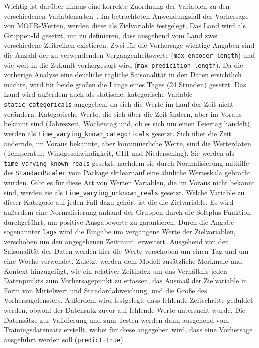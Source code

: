 Wichtig ist darüber hinaus eine korrekte Zuordnung der Variablen zu den verschiedenen Variablenarten~\cite{GitHub.20240307T20:56:16.000Z}.
Im betrachteten Anwendungsfall der Vorhersage von \ac{MOER}-Werten, werden diese als Zielvariable festgelegt.
Das Land wird als Gruppen-Id gesetzt, um zu definieren, dass ausgehend vom Land zwei verschiedene Zeitreihen existieren.
Zwei für die Vorhersage wichtige Angaben sind die Anzahl der zu verwendenden Vergangenheitswerte (\lstinline[columns=fixed]{max_encoder_length}) und wie weit in die Zukunft vorhergesagt wird (\lstinline[columns=fixed]{max_predicition_length}).
Da die vorherige Analyse eine deutliche tägliche Saisonalität in den Daten ersichtlich machte, wird für beide größen die Länge eines Tages (24 Stunden) gesetzt.
Das Land wird außerdem auch als statische, kategorische Variable \lstinline[columns=fixed]{static_categoricals} angegeben, da sich die Werte im Lauf der Zeit nicht verändern.
Kategorische Werte, die sich über die Zeit ändern, aber im Voraus bekannt sind (Jahreszeit, Wochentag und, ob es sich um einen Feiertag handelt), werden als \lstinline[columns=fixed]{time_varying_known_categoricals} gesetzt.
Sich über die Zeit ändernde, im Voraus bekannte, aber kontinuierliche Werte, sind die Wetterdaten (Temperatur, Windgeschwindigkeit, \ac{GHI} und Niederschlag).
Sie werden als \lstinline[columns=fixed]{time_varying_known_reals} gesetzt, nachdem sie durch Normalisierung mithilfe des \lstinline[columns=fixed]{StandardScaler} vom Package \glqq sktlearn\grqq auf eine ähnliche Werteskala gebracht wurden.
Gibt es für diese Art von Werten Variablen, die im Voraus nicht bekannt sind, werden sie als \lstinline[columns=fixed]{time_varying_unknown_reals} gesetzt.
Welche Variable zu dieser Kategorie auf jeden Fall dazu gehört ist die die Zielvariable.
Es wird außerdem eine Normalisierung anhand der Gruppen durch die Softplus-Funktion durchgeführt, um positive Ausgabewerte zu garantieren.
Durch die Angabe sogenannter \lstinline[columns=fixed]{lags} wird die Eingabe um vergangene Werte der Zielvariablen, verschoben um den angegebenen Zeitraum, erweitert.
Ausgehend von der Saisonalität der Daten werden hier die Werte verschoben um einen Tag und um eine Woche verwendet.
Zuletzt werden dem Modell zusätzliche Merkmale und Kontext hinzugefügt, wie ein relativer Zeitindex um das Verhältnis jeden Datenpunkts zum Vorhersagepunkt zu erfassen, das Ausmaß der Zielvariable in Form von Mittelwert und Standardabweichung, und die Größe des Vorhersagefensters.
Außerdem wird festgelegt, dass fehlende Zeitschritte geduldet werden, obwohl der Datensatz zuvor auf fehlende Werte untersucht wurde.
Die Datensätze zur Validierung und zum Testen werden dann ausgehend vom Trainingsdatensatz erstellt, wobei für diese angegeben wird, dass eine Vorhersage ausgeführt werden soll (\lstinline[columns=fixed]{predict=True})~\cite{Labiadh.2023}~\cite{GitHub.20240307T20:56:16.000Z}.

